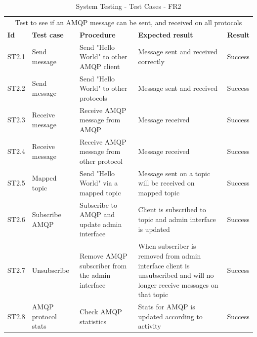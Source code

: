 \begin{table}[ht!]
\begin{tabular}{|m{1cm}|m{2cm}|m{4cm}|m{3cm}|m{1cm}|}
\hline
\rowcolor{lightgray}
\multicolumn{5}{|c|}{\textbf{FR2, AMQP}} \\ \hline
\multicolumn{5}{|c|}{{Test to see if an AMQP message can be sent, and received on all protocols}} \\ \hline 
\textbf{Id} & \textbf{Test case} & \textbf{Procedure} & \textbf{Expected result} & \textbf{Result} \\ \hline
ST2.1 &Send message&Send "Hello World" to other AMQP client & Message sent and received correctly & Success \\ \hline
ST2.2 &Send message&Send "Hello World" to other protocols & Message sent and received&Success \\ \hline
ST2.3 &Receive message&Receive AMQP message from AMQP &Message received&Success \\ \hline
ST2.4 &Receive message&Receive AMQP message from other protocol &Message received&Success \\ \hline
ST2.5 &Mapped topic&Send "Hello World" via a mapped topic &Message sent on a topic will be received on mapped topic&Success \\ \hline
ST2.6 &Subscribe AMQP&Subscribe to AMQP and update admin interface &Client is subscribed to topic and admin interface is updated&Success \\ \hline
ST2.7 &Unsubscribe&Remove AMQP subscriber from the admin interface &When subscriber is removed from admin interface client is unsubscribed and will no longer receive messages on that topic&Success \\ \hline
ST2.8 &AMQP protocol stats&Check AMQP statistics &Stats for AMQP is updated according to activity&Success \\ \hline
\end{tabular}
\caption{System Testing - Test Cases - FR2}
\label{table:system-testing-cases-fr2}
\end{table}

